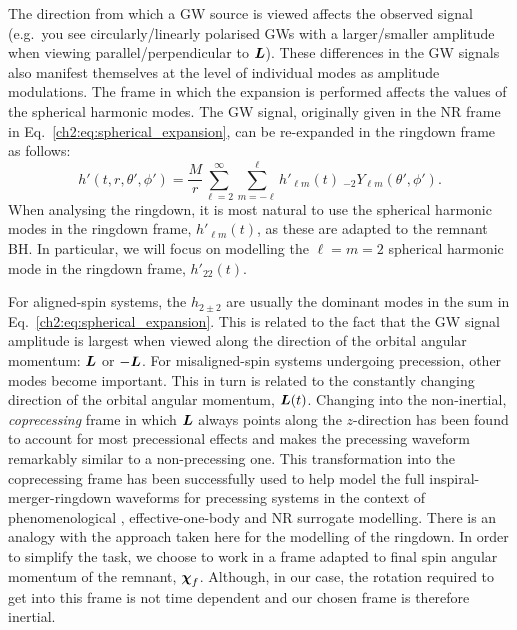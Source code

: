 The direction from which a GW source is viewed affects the observed signal 
(e.g.\ you see circularly/linearly polarised GWs with a larger/smaller amplitude when viewing parallel/perpendicular to $\vb*{L}$).
These differences in the GW signals also manifest themselves at the level of individual modes as amplitude modulations. The frame in which the expansion is performed affects the values of the spherical harmonic modes. 
The GW signal, originally given in the NR frame in Eq.~\ref{ch2:eq:spherical_expansion}, can be re-expanded in the ringdown frame as follows:
\begin{equation}\label{hprimedecomp}
    h'(t, r, \theta', \phi') = \frac{M}{r} \sum_{\ell = 2}^{\infty} \sum_{m = -\ell}^{\ell}  h'_{\ell m}(t) ~ {}_{-2}Y_{\ell m}(\theta', \phi').
\end{equation}
When analysing the ringdown, it is most natural to use the spherical harmonic modes in the ringdown frame, $h'_{\ell m}(t)$, as these are adapted to the remnant BH. 
In particular, we will focus on modelling the $\ell = m = 2$ spherical harmonic mode in the ringdown frame, $h'_{22}(t)$.

For aligned-spin systems, the $h_{2\pm2}$ are usually the dominant modes in the sum in Eq.~\ref{ch2:eq:spherical_expansion}. This is related to the fact that the GW signal amplitude is largest when viewed along the direction of the orbital angular momentum: $\vb*{L}$ or $-\vb*{L}$. For misaligned-spin systems undergoing precession, other modes become important. This in turn is related to the constantly changing direction of the orbital angular momentum, $\vb*{L}(t)$.
Changing into the non-inertial, \emph{coprecessing} frame in which $\vb*{L}$ always points along the $z$-direction has been found to account for most precessional effects and makes the precessing waveform remarkably similar to a non-precessing one.
This transformation into the coprecessing frame has been successfully used to help model the full inspiral-merger-ringdown waveforms for precessing systems \cite{Schmidt:2010it,Schmidt:2012rh} in the context of phenomenological \cite{Hannam:2013oca, Khan:2018fmp, Pratten:2020ceb}, effective-one-body \cite{Pan:2013rra, Ossokine:2020kjp} and NR surrogate \cite{Blackman:2017dfb, Blackman:2017pcm, Varma:2019csw} modelling.
There is an analogy with the approach taken here for the modelling of the ringdown. In order to simplify the task, we choose to work in a frame adapted to final spin angular momentum of the remnant, $\vb*{\chi}_f$.
Although, in our case, the rotation required to get into this frame is not time dependent and our chosen frame is therefore inertial.

